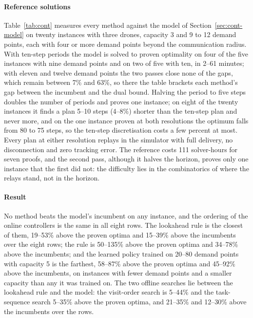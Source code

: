 \documentclass[final,5p,times,twocolumn]{elsarticle}
\begin{document}
\paragraph{Reference solutions}
Table~\ref{tab:cont} measures every method against the model of Section~\ref{sec:cont-model} on
twenty instances with three drones, capacity 3 and 9 to 12 demand points, each with four or more
demand points beyond the communication radius. With ten-step periods the model is solved to proven
optimality on four of the five instances with nine demand points and on two of five with ten, in
2--61 minutes; with eleven and twelve demand points the two passes close none of the gaps, which
remain between 7\% and 63\%, so there the table brackets each method's gap between the incumbent
and the dual bound. Halving the period to five steps doubles the number of periods and proves one
instance; on eight of the twenty instances it finds a plan 5--10 steps (4--8\%) shorter than the
ten-step plan and never more, and on the one instance proven at both resolutions the optimum falls
from 80 to 75 steps, so the ten-step discretisation costs a few percent at most. Every plan at
either resolution replays in the simulator with full delivery, no disconnection and zero tracking
error. The reference costs 111 solver-hours for seven proofs, and the second pass, although it
halves the horizon, proves only one instance that the first did not: the difficulty lies in the
combinatorics of where the relays stand, not in the horizon.

\paragraph{Result}
No method beats the model's incumbent on any instance, and the ordering of the online controllers
is the same in all eight rows. The lookahead rule is the closest of them, 19--53\% above the proven
optima and 15--39\% above the incumbents over the eight rows; the rule is 50--135\% above the
proven optima and 34--78\% above the incumbents; and the learned policy trained on 20--80 demand
points with capacity 5 is the farthest, 58--87\% above the proven optima and 45--92\% above the
incumbents, on instances with fewer demand points and a smaller capacity than any it was trained
on. The two offline searches lie between the lookahead rule and the model: the visit-order search
is 5--44\% and the task-sequence search 5--35\% above the proven optima, and 21--35\% and 12--30\%
above the incumbents over the rows.
\end{document}
